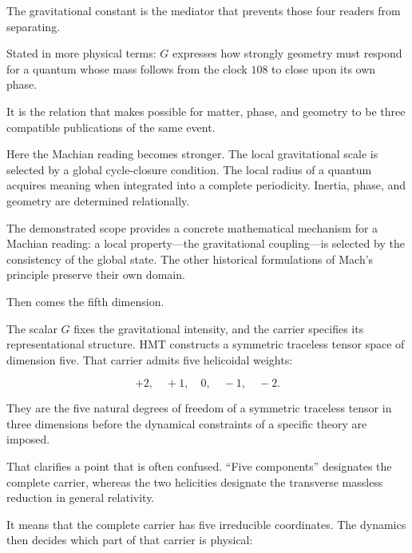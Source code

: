 The gravitational constant is the mediator that prevents those four readers from separating.\par

Stated in more physical terms: \(G\) expresses how strongly geometry must respond for a quantum whose mass follows from the clock \(108\) to close upon its own phase.\par

It is the relation that makes possible for matter, phase, and geometry to be three compatible publications of the same event.\par

Here the Machian reading becomes stronger. The local gravitational scale is selected by a global cycle-closure condition. The local radius of a quantum acquires meaning when integrated into a complete periodicity. Inertia, phase, and geometry are determined relationally.\par

The demonstrated scope provides a concrete mathematical mechanism for a Machian reading: a local property—the gravitational coupling—is selected by the consistency of the global state. The other historical formulations of Mach's principle preserve their own domain.\par

Then comes the fifth dimension.\par

The scalar \(G\) fixes the gravitational intensity, and the carrier specifies its representational structure. HMT constructs a symmetric traceless tensor space of dimension five. That carrier admits five helicoidal weights:\par

\[
+2,\quad +1,\quad 0,\quad -1,\quad -2.
\]

They are the five natural degrees of freedom of a symmetric traceless tensor in three dimensions before the dynamical constraints of a specific theory are imposed.\par

That clarifies a point that is often confused. “Five components” designates the complete carrier, whereas the two helicities designate the transverse massless reduction in general relativity.\par

It means that the complete carrier has five irreducible coordinates. The dynamics then decides which part of that carrier is physical:\par

